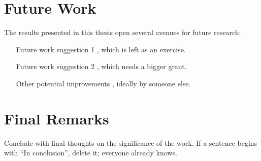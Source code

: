 \section{Future Work}

The results presented in this thesis open several avenues for future
research:

\begin{itemize}
  \item [Future work suggestion 1], which is left as an exercise.
  \item [Future work suggestion 2], which needs a bigger grant.
  \item [Other potential improvements], ideally by someone else.
\end{itemize}

\section{Final Remarks}

Conclude with final thoughts on the significance of the work. If a
sentence begins with ``In conclusion'', delete it; everyone already
knows.
